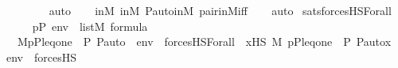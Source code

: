 \begin{isabellebody}
\ \ \ \ \ \ \ \ \isamarkupfalse%
\ auto{\isacharbrackleft}{\kern0pt}{}{\isacharbrackright}{\kern0pt}\isanewline
\ \ \isamarkupfalse%
\ {\isasymF}{\isacharunderscore}{\kern0pt}in{\isacharunderscore}{\kern0pt}M\ {\isasymG}{\isacharunderscore}{\kern0pt}in{\isacharunderscore}{\kern0pt}M\ P{\isacharunderscore}{\kern0pt}auto{\isacharunderscore}{\kern0pt}in{\isacharunderscore}{\kern0pt}M\ pair{\isacharunderscore}{\kern0pt}in{\isacharunderscore}{\kern0pt}M{\isacharunderscore}{\kern0pt}iff\isanewline
\ \ \isamarkupfalse%
\ auto%
\endisatagproof
{\isafoldproof}%
%
\isadelimproof
\isanewline
%
\endisadelimproof
\isanewline
{}\isamarkupfalse%
\ sats{\isacharunderscore}{\kern0pt}forcesHS{\isacharunderscore}{\kern0pt}Forall{\isacharprime}{\kern0pt}{\isacharcolon}{\kern0pt}\isanewline
\ \ \isanewline
\ \ \ \ {\isachardoublequoteopen}p{\isasymin}P{\isachardoublequoteclose}\ {\isachardoublequoteopen}env\ {\isasymin}\ list{\isacharparenleft}{\kern0pt}M{\isacharparenright}{\kern0pt}{\isachardoublequoteclose}\ {\isachardoublequoteopen}{\isasymphi}{\isasymin}formula{\isachardoublequoteclose}\isanewline
\ \ \isanewline
\ \ \ \ {\isachardoublequoteopen}M{\isacharcomma}{\kern0pt}{\isacharbrackleft}{\kern0pt}p{\isacharcomma}{\kern0pt}P{\isacharcomma}{\kern0pt}leq{\isacharcomma}{\kern0pt}one{\isacharcomma}{\kern0pt}{\isasymlangle}{\isasymF}{\isacharcomma}{\kern0pt}\ {\isasymG}{\isacharcomma}{\kern0pt}\ P{\isacharcomma}{\kern0pt}\ P{\isacharunderscore}{\kern0pt}auto{\isasymrangle}{\isacharbrackright}{\kern0pt}\ {\isacharat}{\kern0pt}\ env\ {\isasymTurnstile}\ forcesHS{\isacharparenleft}{\kern0pt}Forall{\isacharparenleft}{\kern0pt}{\isasymphi}{\isacharparenright}{\kern0pt}{\isacharparenright}{\kern0pt}\ {\isasymlongleftrightarrow}\ {\isacharparenleft}{\kern0pt}{\isasymforall}x{\isasymin}HS{\isachardot}{\kern0pt}\ M{\isacharcomma}{\kern0pt}\ {\isacharbrackleft}{\kern0pt}p{\isacharcomma}{\kern0pt}P{\isacharcomma}{\kern0pt}leq{\isacharcomma}{\kern0pt}one{\isacharcomma}{\kern0pt}{\isasymlangle}{\isasymF}{\isacharcomma}{\kern0pt}\ {\isasymG}{\isacharcomma}{\kern0pt}\ P{\isacharcomma}{\kern0pt}\ P{\isacharunderscore}{\kern0pt}auto{\isasymrangle}{\isacharcomma}{\kern0pt}x{\isacharbrackright}{\kern0pt}\ {\isacharat}{\kern0pt}\ env\ {\isasymTurnstile}\ forcesHS{\isacharparenleft}{\kern0pt}{\isasymphi}{\isacharparenright}{\kern0pt}{\isacharparenright}{\kern0pt}{\isachardoublequoteclose}\isanewline
%
\isadelimproof
\ \ %
\endisadelimproof
%
\isatagproof
{}\isamarkupfalse%

\end{isabellebody}

